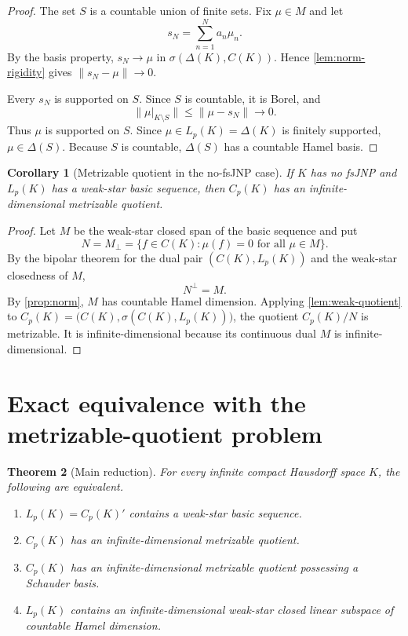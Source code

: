 \documentclass[11pt]{article}
\newtheorem{theorem}{Theorem}[section]
\newtheorem{corollary}[theorem]{Corollary}
\newcommand{\Cp}{C_p}
\newcommand{\Lp}{L_p}
\begin{document}
\begin{proof}
The set $S$ is a countable union of finite sets.  Fix $\mu\in M$ and let
\[
 s_N=\sum_{n=1}^N a_n\mu_n.
\]
By the basis property, $s_N\to\mu$ in
$\sigma(\Delta(K),C(K))$.  Hence \cref{lem:norm-rigidity} gives
$\|s_N-\mu\|\to0$.

Every $s_N$ is supported on $S$.  Since $S$ is countable, it is Borel, and
\[
 \bigl\|\mu|_{K\setminus S}\bigr\|
 \leq \|\mu-s_N\|\longrightarrow0.
\]
Thus $\mu$ is supported on $S$.  Since $\mu\in\Lp(K)=\Delta(K)$ is finitely
supported, $\mu\in\Delta(S)$.  Because $S$ is countable, $\Delta(S)$ has a
countable Hamel basis.
\end{proof}

\begin{corollary}[Metrizable quotient in the no-fsJNP case]
\label{cor:groth-quotient}
If $K$ has no fsJNP and $\Lp(K)$ has a weak-star basic sequence, then
$\Cp(K)$ has an infinite-dimensional metrizable quotient.
\end{corollary}

\begin{proof}
Let $M$ be the weak-star closed span of the basic sequence and put
\[
 N=M_\perp=\{f\in C(K):\mu(f)=0\text{ for all }\mu\in M\}.
\]
By the bipolar theorem for the dual pair $(C(K),\Lp(K))$ and the weak-star
closedness of $M$,
\[
 N^\perp=M.
\]
By \cref{prop:norm}, $M$ has countable Hamel dimension.  Applying
\cref{lem:weak-quotient} to
$\Cp(K)=\bigl(C(K),\sigma(C(K),\Lp(K))\bigr)$, the quotient
$\Cp(K)/N$ is metrizable.  It is infinite-dimensional because its continuous
dual $M$ is infinite-dimensional.
\end{proof}

\section{Exact equivalence with the metrizable-quotient problem}

\begin{theorem}[Main reduction]\label{thm:equivalence}
For every infinite compact Hausdorff space $K$, the following are equivalent.
\begin{enumerate}[label=\textup{(\arabic*)}]
\item $\Lp(K)=\Cp(K)'$ contains a weak-star basic sequence.
\item $\Cp(K)$ has an infinite-dimensional metrizable quotient.
\item $\Cp(K)$ has an infinite-dimensional metrizable quotient possessing a
      Schauder basis.
\item $\Lp(K)$ contains an infinite-dimensional weak-star closed linear
      subspace of countable Hamel dimension.
\end{enumerate}
\end{theorem}
\end{document}
